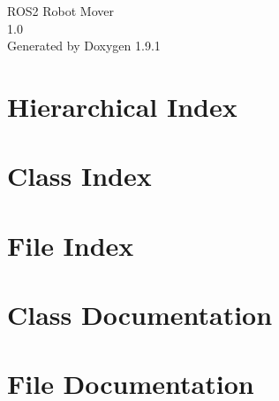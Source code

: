 \let\mypdfximage\pdfximage\def\pdfximage{\immediate\mypdfximage}\documentclass[twoside]{book}
\newcommand{\+}{\discretionary{\mbox{\scriptsize$\hookleftarrow$}}{}{}}
\newcommand{\clearemptydoublepage}{%
  \newpage{\pagestyle{empty}\cleardoublepage}%
}
\begin{document}
\raggedbottom

\hypersetup{pageanchor=false,
             bookmarksnumbered=true,
             pdfencoding=unicode
            }
\begin{titlepage}
\vspace*{7cm}
\begin{center}%
{\Large ROS2 Robot Mover \\[1ex]\large 1.\+0 }\\
\vspace*{1cm}
{\large Generated by Doxygen 1.9.1}\\
\end{center}
\end{titlepage}
\clearemptydoublepage
{}
\tableofcontents
\clearemptydoublepage
{}
\hypersetup{pageanchor=true}

\chapter{Hierarchical Index}

\chapter{Class Index}

\chapter{File Index}

\chapter{Class Documentation}

\chapter{File Documentation}


\backmatter
\newpage
{}
\clearemptydoublepage
{}
\printindex
\end{document}
